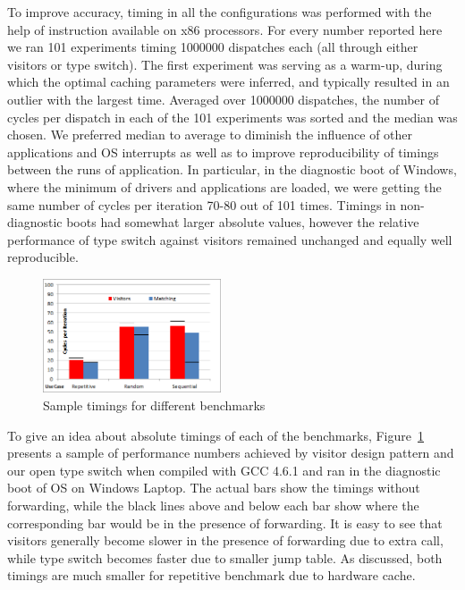 To improve accuracy, timing in all the configurations was performed with the 
help of  instruction available on x86 processors. For every number reported 
here we ran 101 experiments timing 1000000 dispatches each (all through either 
visitors or type switch). The first experiment was serving as a warm-up, during 
which the optimal caching parameters were inferred, and typically resulted in an 
outlier with the largest time. Averaged over 1000000 dispatches, the number of 
cycles per dispatch in each of the 101 experiments was sorted and the median was 
chosen. We preferred median to average to diminish the influence of other 
applications and OS interrupts as well as to improve reproducibility of timings 
between the runs of application. In particular, in the diagnostic boot of 
Windows, where the minimum of drivers and applications are loaded, we were 
getting the same number of cycles per iteration 70-80 out of 101 times. Timings 
in non-diagnostic boots had somewhat larger absolute values, however the 
relative performance of type switch against visitors remained unchanged and 
equally well reproducible.

\begin{figure}[htbp]
  \centering
    \includegraphics[width=0.47\textwidth]{VisitorsCompare.png}
  \caption{Sample timings for different benchmarks}
  \label{fig:VisitorsComparison}
\end{figure}

To give an idea about absolute timings of each of the benchmarks, 
Figure~\ref{fig:VisitorsComparison} presents a sample of performance numbers 
achieved by visitor design pattern and our open type switch when compiled with 
GCC 4.6.1 and ran in the diagnostic boot of OS on Windows Laptop. The actual 
bars show the timings without forwarding, while the black lines above and below 
each bar show where the corresponding bar would be in the presence of 
forwarding. It is easy to see that visitors generally become slower in the 
presence of forwarding due to extra call, while type switch becomes faster due 
to smaller jump table. As discussed, both timings are much smaller for 
repetitive benchmark due to hardware cache.

